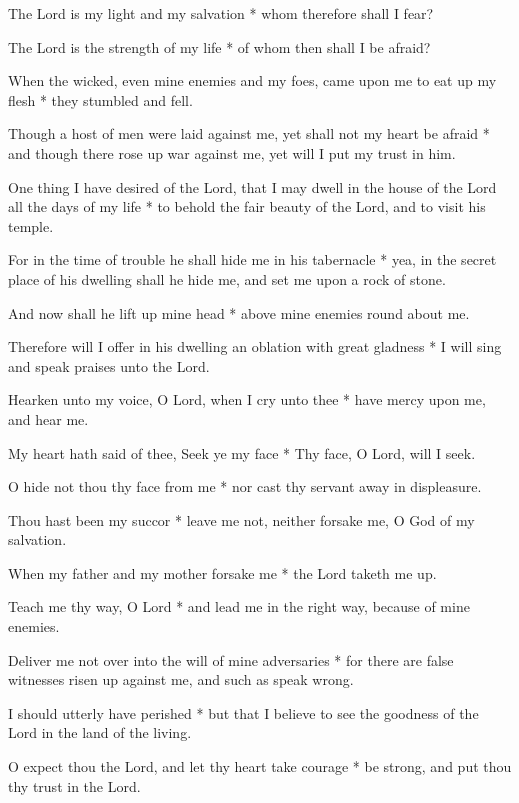 The Lord is my light and my salvation * whom therefore shall I fear?

The Lord is the strength of my life * of whom then shall I be afraid?

When the wicked, even mine enemies and my foes, came upon me to eat up my flesh * they stumbled and fell.

Though a host of men were laid against me, yet shall not my heart be afraid * and though there rose up war against me, yet will I put my trust in him.

One thing I have desired of the Lord, that I may dwell in the house of the Lord all the days of my life * to behold the fair beauty of the Lord, and to visit his temple.

For in the time of trouble he shall hide me in his tabernacle * yea, in the secret place of his dwelling shall he hide me, and set me upon a rock of stone.

And now shall he lift up mine head * above mine enemies round about me.

Therefore will I offer in his dwelling an oblation with great gladness * I will sing and speak praises unto the Lord.

Hearken unto my voice, O Lord, when I cry unto thee * have mercy upon me, and hear me.

My heart hath said of thee, Seek ye my face * Thy face, O Lord, will I seek.

O hide not thou thy face from me * nor cast thy servant away in displeasure.

Thou hast been my succor * leave me not, neither forsake me, O God of my salvation.

When my father and my mother forsake me * the Lord taketh me up.

Teach me thy way, O Lord * and lead me in the right way, because of mine enemies.

Deliver me not over into the will of mine adversaries * for there are false witnesses risen up against me, and such as speak wrong.

I should utterly have perished * but that I believe  to see the goodness of the Lord in the land of the living.

O expect thou the Lord, and let thy heart take courage * be strong, and put thou thy trust in the Lord.